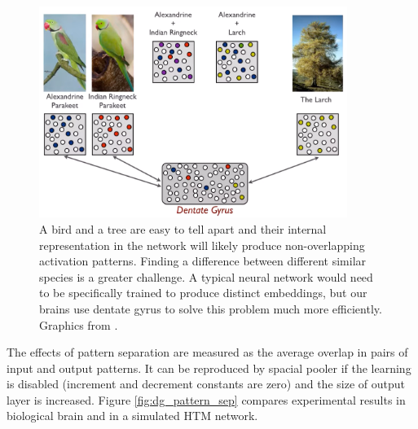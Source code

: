 \documentclass[12pt]{article}
\begin{document}
\begin{figure}[!htbp]
	\centering
	\includegraphics[width=10cm]{pattern_sep}
	\caption{A bird and a tree are easy to tell apart and their internal representation in the network will likely produce non-overlapping activation patterns. Finding a difference between different similar species is a greater challenge. A typical neural network would need to be specifically trained to produce distinct embeddings, but our brains use dentate gyrus to solve this problem much more efficiently. Graphics from \cite{pattern_sep}.}
	\label{fig:pattern_sep}
\end{figure}

The effects of pattern separation are measured as the average overlap in pairs of input and output patterns. It can be reproduced by spacial pooler if the learning is disabled (increment and decrement constants are zero) and the size of output layer is increased. Figure \ref{fig:dg_pattern_sep} compares experimental results in biological brain and in a simulated HTM network.
\end{document}
